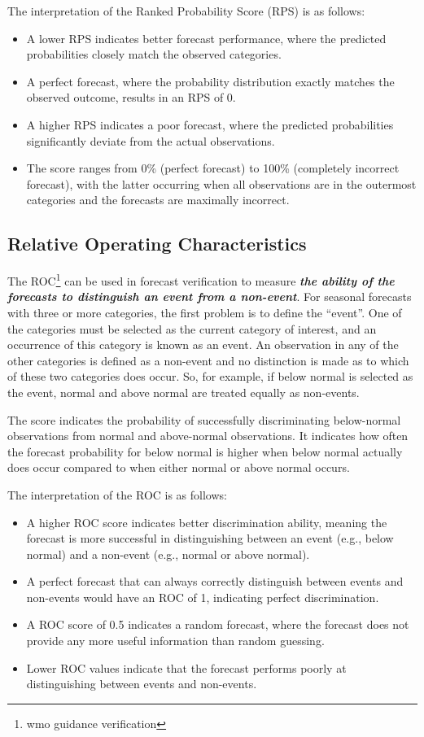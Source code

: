 The interpretation of the Ranked Probability Score (RPS) is as follows:  
\begin{itemize}
    \item A lower RPS indicates better forecast performance, where the predicted probabilities closely match the observed categories.  
    \item A perfect forecast, where the probability distribution exactly matches the observed outcome, results in an RPS of 0.  
    \item A higher RPS indicates a poor forecast, where the predicted probabilities significantly deviate from the actual observations.  
    \item The score ranges from 0\% (perfect forecast) to 100\% (completely incorrect forecast), with the latter occurring when all observations are in the outermost categories and the forecasts are maximally incorrect.  
\end{itemize}

\subsection{Relative Operating Characteristics}

The ROC\footnote{wmo guidance verification} can be used in forecast verification to measure \textbf{\textit{the ability of the forecasts to distinguish an event from a non-event}}. For seasonal forecasts with three or more categories, the first problem is to define the “event”. One of the categories must be selected as the current category of interest, and an occurrence of this category is known as an event. An observation in any of the other categories is defined as a non-event and no distinction is made as to which of these two categories does occur. So, for example, if below normal is selected as the event, normal and above normal are treated equally as non-events.

The score indicates the probability of successfully discriminating below-normal observations from normal and above-normal observations. It indicates how often the forecast probability for below normal is higher when below normal actually does occur compared to when either normal or above normal occurs.

The interpretation of the ROC is as follows:  
\begin{itemize}
    \item A higher ROC score indicates better discrimination ability, meaning the forecast is more successful in distinguishing between an event (e.g., below normal) and a non-event (e.g., normal or above normal).  
    \item A perfect forecast that can always correctly distinguish between events and non-events would have an ROC of 1, indicating perfect discrimination.  
    \item A ROC score of 0.5 indicates a random forecast, where the forecast does not provide any more useful information than random guessing.  
    \item Lower ROC values indicate that the forecast performs poorly at distinguishing between events and non-events.  
\end{itemize}


